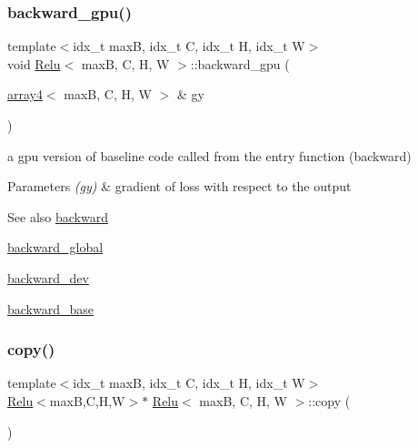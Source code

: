 \subsubsection{\texorpdfstring{backward\+\_\+gpu()}{backward\_gpu()}}
{\footnotesize\ttfamily template$<$idx\+\_\+t maxB, idx\+\_\+t C, idx\+\_\+t H, idx\+\_\+t W$>$ \\
void \hyperlink{structRelu}{Relu}$<$ maxB, C, H, W $>$\+::backward\+\_\+gpu (\begin{DoxyParamCaption}\item[{\hyperlink{structarray4}{array4}$<$ maxB, C, H, W $>$ \&}]{gy }\end{DoxyParamCaption})\hspace{0.3cm}{\ttfamily [inline]}}



a gpu version of baseline code called from the entry function (backward) 


\begin{DoxyParams}{Parameters}
{\em (gy)} & gradient of loss with respect to the output \\
\hline
\end{DoxyParams}
\begin{DoxySeeAlso}{See also}
\hyperlink{structRelu_af9d3182c5103542c1c9796edc449847c}{backward} 

\hyperlink{softmaxcrossentropy_8h_a47d56a9a23e08247b227f4aac17413e0}{backward\+\_\+global} 

\hyperlink{structRelu_a0b13992d8093aa08ed9036cac3a5437b}{backward\+\_\+dev} 

\hyperlink{structRelu_ad2da72c21984db8c9cec57c6d60bf741}{backward\+\_\+base} 
\end{DoxySeeAlso}
\mbox{\label{structRelu_ac5d197a3266cc0d939bc0d54ab23df9f}} 
\subsubsection{\texorpdfstring{copy()}{copy()}}
{\footnotesize\ttfamily template$<$idx\+\_\+t maxB, idx\+\_\+t C, idx\+\_\+t H, idx\+\_\+t W$>$ \\
\hyperlink{structRelu}{Relu}$<$maxB,C,H,W$>$$\ast$ \hyperlink{structRelu}{Relu}$<$ maxB, C, H, W $>$\+::copy (\begin{DoxyParamCaption}{ }\end{DoxyParamCaption})\hspace{0.3cm}{\ttfamily [inline]}}



